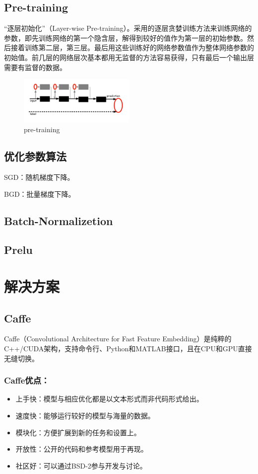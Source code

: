 \documentclass[12pt]{article}
\begin{document}
\subsection{Pre-training}
``逐层初始化''（Layer-wise Pre-training）。采用的逐层贪婪训练方法来训练网络的参数，即先训练网络的第一个隐含层，解得到较好的值作为第一层的初始参数。然后接着训练第二层，第三层。最后用这些训练好的网络参数值作为整体网络参数的初始值。前几层的网络层次基本都用无监督的方法容易获得，只有最后一个输出层需要有监督的数据。
\begin{figure}[!ht]
\centering
\includegraphics[width=0.5\textwidth]{pre-training}
\caption{pre-training}
\end{figure}

\subsection{优化参数算法}
SGD：随机梯度下降。

BGD：批量梯度下降。

\subsection{Batch-Normalizetion}

\subsection{Prelu}


\section{解决方案}
\subsection{Caffe}
Caffe（Convolutional Architecture for Fast Feature Embedding）是纯粹的C++/CUDA架构，支持命令行、Python和MATLAB接口，且在CPU和GPU直接无缝切换。
\subsubsection{Caffe优点：}
\begin{itemize}
\item 上手快：模型与相应优化都是以文本形式而非代码形式给出。
\item 速度快：能够运行较好的模型与海量的数据。
\item 模块化：方便扩展到新的任务和设置上。
\item 开放性：公开的代码和参考模型用于再现。
\item 社区好：可以通过BSD-2参与开发与讨论。
\end{itemize}
\end{document}
